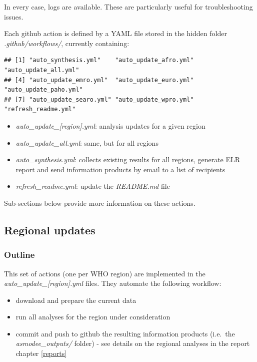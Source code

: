 \documentclass[]{book}
\providecommand{\tightlist}{%
  \setlength{\itemsep}{0pt}\setlength{\parskip}{0pt}}
\begin{document}
In every case, logs are available. These are particularly useful for
troubleshooting issues.

Each github action is defined by a YAML file stored in the hidden folder
\emph{.github/workflows/}, currently containing:

\begin{verbatim}
## [1] "auto_synthesis.yml"    "auto_update_afro.yml"  "auto_update_all.yml"  
## [4] "auto_update_emro.yml"  "auto_update_euro.yml"  "auto_update_paho.yml" 
## [7] "auto_update_searo.yml" "auto_update_wpro.yml"  "refresh_readme.yml"
\end{verbatim}

\begin{itemize}
\tightlist
\item
  \emph{auto\_update\_{[}region{]}.yml}: analysis updates for a given region
\item
  \emph{auto\_update\_all.yml}: same, but for all regions
\item
  \emph{auto\_synthesis.yml}: collects existing results for all regions, generate ELR
  report and send information products by email to a list of recipients
\item
  \emph{refresh\_readme.yml}: update the \emph{README.md} file
\end{itemize}

Sub-sections below provide more information on these actions.

\hypertarget{regional-updates}{%
\subsection{Regional updates}\label{regional-updates}}

\hypertarget{outline}{%
\subsubsection{Outline}\label{outline}}

This set of actions (one per WHO region) are implemented in the
\emph{auto\_update\_{[}region{]}.yml} files. They automate the following workflow:

\begin{itemize}
\tightlist
\item
  download and prepare the current data
\item
  run all analyses for the region under consideration
\item
  commit and push to github the resulting information products (i.e.~the
  \emph{asmodee\_outputs/} folder) - see details on the regional analyses in the report
  chapter \ref{reports}
\end{itemize}
\end{document}
